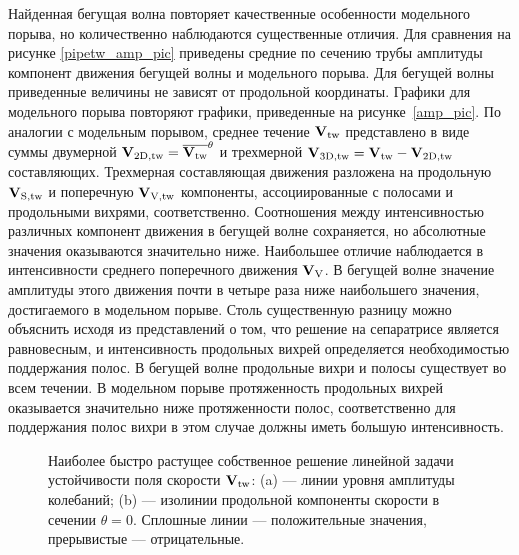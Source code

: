 Найденная бегущая волна повторяет качественные особенности модельного порыва, но количественно наблюдаются существенные отличия. Для сравнения на рисунке \ref{pipetw_amp_pic} приведены средние по сечению трубы амплитуды компонент движения бегущей волны и модельного порыва. Для бегущей волны приведенные величины не зависят от продольной координаты. Графики для модельного порыва повторяют графики, приведенные на рисунке~\ref{amp_pic}. По аналогии с модельным порывом, среднее течение $\mathbf{V}_\mathrm{tw}$ представлено в виде суммы двумерной $\mathbf{V}_\mathrm{2D,tw} = \overline{\mathbf{V}_\mathrm{tw}}^\theta$ и трехмерной  $\mathbf{V}_\mathrm{3D,tw} = \mathbf{V}_\mathrm{tw} - \mathbf{V}_\mathrm{2D,tw}$ составляющих. Трехмерная составляющая движения разложена на продольную $\mathbf{V}_\mathrm{S,tw}$ и поперечную $\mathbf{V}_\mathrm{V,tw}$ компоненты, ассоциированные с полосами и продольными вихрями, соответственно. Соотношения между интенсивностью различных компонент движения в бегущей волне сохраняется, но абсолютные значения оказываются значительно ниже. Наибольшее отличие наблюдается в интенсивности среднего поперечного движения $\mathbf{V}_\mathrm{V}$. В бегущей волне значение амплитуды этого движения почти в четыре раза ниже наибольшего значения, достигаемого в модельном порыве. Столь существенную разницу можно объяснить исходя из представлений о том, что решение на сепаратрисе является равновесным, и интенсивность продольных вихрей определяется необходимостью поддержания полос. В бегущей волне продольные вихри и полосы существует во всем течении. В модельном порыве протяженность продольных вихрей оказывается значительно ниже протяженности полос, соответственно для поддержания полос вихри в этом случае должны иметь большую интенсивность. 


\begin{figure}
\caption{Наиболее быстро растущее собственное решение линейной задачи устойчивости поля скорости $\mathbf{V}_\mathrm{tw}$: (a) --- линии уровня амплитуды колебаний; (b) --- изолинии продольной компоненты скорости в сечении $\theta = 0$. Сплошные линии --- положительные значения, прерывистые --- отрицательные.}
\label{pipetw_lin_pic}
\end{figure}


